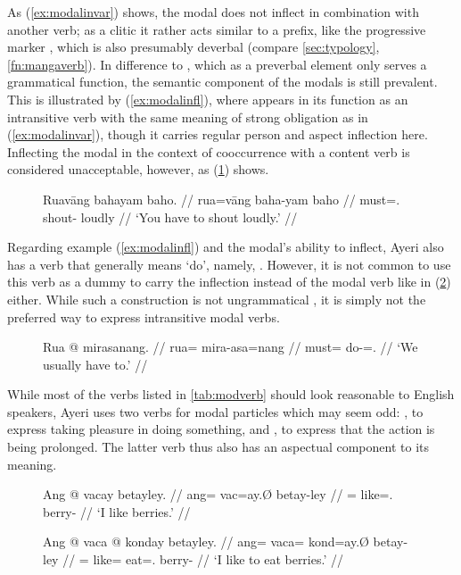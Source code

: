 As (\ref{ex:modalinvar}) shows, the modal does not inflect in combination with
another verb; as a clitic it rather acts similar to a prefix, like the
progressive marker , which is also presumably deverbal
(compare \autoref{sec:typology}, \autoref{fn:mangaverb}). In difference to
, which as a preverbal element only serves a grammatical
function, the semantic component of the modals is still prevalent. This is
illustrated by (\ref{ex:modalinfl}), where  appears in its
function as an intransitive verb with the same meaning of strong obligation as
in (\ref{ex:modalinvar}), though it carries regular person and aspect
inflection here. Inflecting the modal in the context of cooccurrence with a
content verb is considered unacceptable, however, as (\ref{ex:modalinfl_2})
shows.

\begin{figure}[h]
\ex\label{ex:modalinfl_2}\ljudge*\begingl
	\gla Ruavāng bahayam baho. //
	\glb rua=vāng baha-yam baho //
	\glc must=\Second{}.\AgtT{} shout-\Ptcp{} loudly //
	\glft `You have to shout loudly.' //
\endgl\xe
\end{figure}

Regarding example (\ref{ex:modalinfl}) and the modal's ability to inflect,
Ayeri also has a verb that generally means `do', namely, .
However, it is not common to use this verb as a dummy to carry the inflection
instead of the modal verb like in (\ref{ex:modaldummy}) either. While such a
construction is not ungrammatical , it is simply not the preferred
way to express intransitive modal verbs.

\begin{figure}[h]
\ex\label{ex:modaldummy}\ljudge\ques\begingl
	\gla Rua @ mirasanang. //
	\glb rua= mira-asa=nang //
	\glc must= do-\Hab{}=\Fpl{}.\Aarg{} //
	\glft `We usually have to.' //
\endgl\xe
\end{figure}

While most of the verbs listed in \autoref{tab:modverb} should look reasonable
to English speakers, Ayeri uses two verbs for modal particles which may seem
odd: , to express taking pleasure in doing something,
and , to express that the action is being
prolonged. The latter verb thus also has an aspectual component to its meaning.

\begin{figure}[h]
\pex\label{ex:vacvaca}
\a\label{ex:vacfull}\begingl
	\gla Ang @ vacay betayley. //
	\glb ang= vac=ay.Ø betay-ley //
	\glc \AgtT{}= like=\Fsg{}.\Top{} berry-\PargI{} //
	\glft `I like berries.' //
\endgl

\a\label{ex:vacamod}\begingl
	\gla Ang @ vaca @ konday betayley. //
	\glb ang= vaca= kond=ay.Ø betay-ley //
	\glc \AgtT{}= like= eat=\Fsg{}.\Top{} berry-\PargI{} //
	\glft `I like to eat berries.' //
\endgl
\xe
\end{figure}

